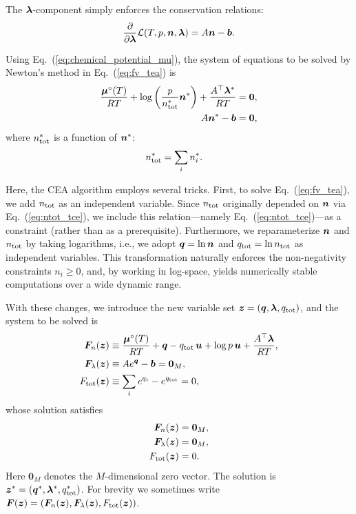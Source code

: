 The $\boldsymbol{\lambda}$-component simply enforces the conservation relations:
\begin{align}
\label{eq:Lpartiall}
\frac{\partial}{\partial \boldsymbol{\lambda}}  \mathcal{L}(T, p, \boldsymbol{n}, \boldsymbol{\lambda}) = A \boldsymbol{n} - \boldsymbol{b}.
\end{align}

Using Eq.~(\ref{eq:chemical_potential_mu}), the system of equations to be solved by Newton’s method in Eq.~(\ref{eq:fv_tea}) is
\begin{align}
\label{eq:Lpartialnx}
    \frac{\boldsymbol{\mu}^\circ(T)}{RT}+ \log{\left(\frac{p}{n_\mathrm{tot}^\ast} \boldsymbol{n}^\ast \right)} + \frac{A^\top \boldsymbol{\lambda}^\ast}{RT}   &= \boldsymbol{0}, \\
    A \boldsymbol{n}^\ast - \boldsymbol{b} &= \boldsymbol{0},
\end{align}
where $n_\mathrm{tot}^\ast$ is a function of $\boldsymbol{n}^\ast$:
\begin{align}
n_\mathrm{tot}^\ast &= \sum_i n_i^\ast.
\end{align}



Here, the CEA algorithm employs several tricks. First, to solve Eq.~(\ref{eq:fv_tea}), we add $n_\mathrm{tot}$ as an independent variable. Since $n_\mathrm{tot}$ originally depended on $\boldsymbol{n}$ via Eq.~(\ref{eq:ntot_tce}), we include this relation—namely Eq.~(\ref{eq:ntot_tce})—as a constraint (rather than as a prerequisite). Furthermore, we reparameterize $\boldsymbol{n}$ and $n_\mathrm{tot}$ by taking logarithms, i.e., we adopt $\boldsymbol{q} = \ln{\boldsymbol{n}}$ and $q_\mathrm{tot} = \ln{n_\mathrm{tot}}$ as independent variables. This transformation naturally enforces the non-negativity constraints $n_i \ge 0$, and, by working in log-space, yields numerically stable computations over a wide dynamic range. 

With these changes, we introduce the new variable set $\boldsymbol{z} = (\boldsymbol{q}, \boldsymbol{\lambda}, q_\mathrm{tot})$, and the system to be solved is
\begin{align}
\label{eq:Lpartialncea}
    \boldsymbol{F}_n (\boldsymbol{z}) &\equiv \frac{\boldsymbol{\mu}^\circ(T)}{RT} + \boldsymbol{q} - q_\mathrm{tot} \, \boldsymbol{u} + \log{p} \, \boldsymbol{u}  + \frac{A^\top \boldsymbol{\lambda}}{RT},  \\
    \boldsymbol{F}_\lambda (\boldsymbol{z}) &\equiv A e^{\boldsymbol{q}} - \boldsymbol{b} = \boldsymbol{0}_M, \\
    F_\mathrm{tot} (\boldsymbol{z}) &\equiv \sum_i {e^{q_i}} - e^{q_\mathrm{tot}} = 0,
\end{align}
whose solution satisfies
\begin{align}
  \boldsymbol{F}_n (\boldsymbol{z}) &= \boldsymbol{0}_M, \\
  \boldsymbol{F}_\lambda (\boldsymbol{z}) &= \boldsymbol{0}_M, \\
  F_\mathrm{tot} (\boldsymbol{z}) &= 0.
\end{align}
Here $\boldsymbol{0}_M$ denotes the $M$-dimensional zero vector. The solution is $\boldsymbol{z}^\ast = (\boldsymbol{q}^\ast, \boldsymbol{\lambda}^\ast, q_\mathrm{tot}^\ast)$. For brevity we sometimes write $\boldsymbol{F} (\boldsymbol{z}) = (\boldsymbol{F}_n (\boldsymbol{z}), \boldsymbol{F}_\lambda (\boldsymbol{z}), F_\mathrm{tot} (\boldsymbol{z}))$.

